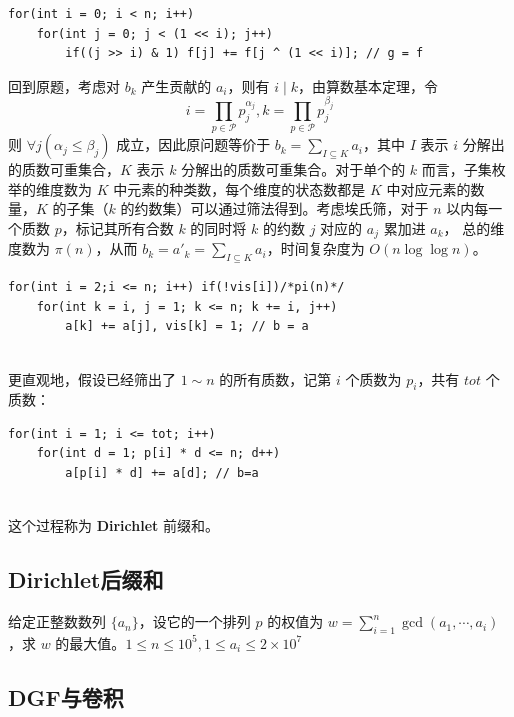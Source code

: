 \documentclass[12pt,a4paper]{article}
\begin{document}
\begin{lstlisting}
for(int i = 0; i < n; i++) 
	for(int j = 0; j < (1 << i); j++) 
		if((j >> i) & 1) f[j] += f[j ^ (1 << i)]; // g = f
\end{lstlisting}
回到原题，考虑对 $b_k$ 产生贡献的 $a_i$，则有 $i\mid k$，由算数基本定理，令 \begin{equation*}
	\displaystyle i=\prod_{p\in\mathcal{P}}p_j^{\alpha_j},k=\prod_{p\in\mathcal{P}}p_j^{\beta_j}
\end{equation*}
则 $\forall j(\alpha_j\le\beta_j)$ 成立，因此原问题等价于 $\displaystyle b_k=\sum_{I\subseteq K}a_i$，其中 $I$ 表示 $i$ 分解出的质数可重集合，$K$ 表示 $k$ 分解出的质数可重集合。对于单个的 $k$ 而言，子集枚举的维度数为 $K$ 中元素的种类数，每个维度的状态数都是 $K$ 中对应元素的数量，$K$ 的子集（$k$ 的约数集）可以通过筛法得到。考虑埃氏筛，对于 $n$ 以内每一个质数 $p$，标记其所有合数 $k$ 的同时将 $k$ 的约数 $j$ 对应的 $a_j$ 累加进 $a_k$， 总的维度数为 $\pi(n)$，从而 $\displaystyle b_k=a'_k=\sum_{I\subseteq K}a_i$，时间复杂度为 $O(n\log\log n)$。

\begin{lstlisting}
for(int i = 2;i <= n; i++) if(!vis[i])/*pi(n)*/ 
	for(int k = i, j = 1; k <= n; k += i, j++) 		
		a[k] += a[j], vis[k] = 1; // b = a
	
\end{lstlisting}
更直观地，假设已经筛出了 $1\sim n$ 的所有质数，记第 $i$ 个质数为 $p_i$，共有 $tot$ 个质数：

\begin{lstlisting}
for(int i = 1; i <= tot; i++)
	for(int d = 1; p[i] * d <= n; d++)
		a[p[i] * d] += a[d]; // b=a
	
\end{lstlisting}
这个过程称为 \textbf{Dirichlet} 前缀和。

\subsection{Dirichlet后缀和}
\begin{mdframed}[leftline=true, linewidth=2pt, linecolor=gray]
	给定正整数数列 $\{a_n\}$，设它的一个排列 $p$ 的权值为 $w=\displaystyle \sum_{i=1}^{n}\gcd(a_1,\cdots,a_i)$，求 $w$ 的最大值。$1\le n\le10^5,1\le a_i\le2\times10^7$
\end{mdframed}
\subsection{DGF与卷积}

\newpage
\end{document}
